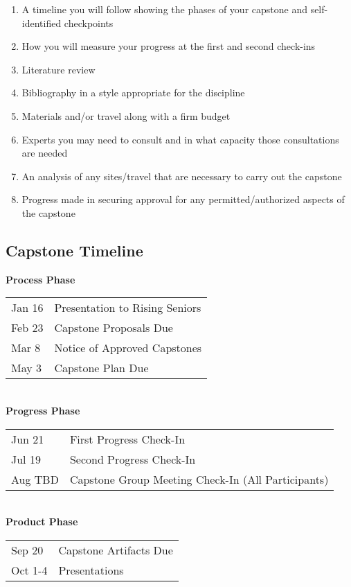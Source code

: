 \begin{enumerate}\itemsep=0mm

\item A timeline you will follow showing the phases of your capstone and self-identified checkpoints
\item How you will measure your progress at the first and second check-ins
\item Literature review
\item Bibliography in a style appropriate for the discipline
\item Materials and/or travel along with a firm budget
\item Experts you may need to consult and in what capacity those consultations are needed
\item An analysis of any sites/travel that are necessary to carry out the capstone
\item Progress made in securing approval for any permitted/authorized aspects of the capstone

\end{enumerate}

\subsection{Capstone Timeline}

 \textbf{Process Phase}\\

\begin{tabular}{ll}
  Jan 16&	Presentation to Rising Seniors\\
  Feb 23&	Capstone Proposals Due\\
  Mar 8	&Notice of Approved Capstones\\
  May 3	&Capstone Plan Due\\
\end{tabular}\\


\noindent \textbf{Progress Phase}\\

\begin{tabular}{ll}
  Jun 21	&	First Progress Check-In\\
  Jul 19	&	Second Progress Check-In\\
  Aug TBD	&	Capstone Group Meeting Check-In (All Participants)\\
\end{tabular}\\



\noindent \textbf{Product Phase  }\\

\begin{tabular}{ll}
 Sep 20	&	Capstone Artifacts Due\\
 Oct 1-4	&	Presentations 
\end{tabular}


